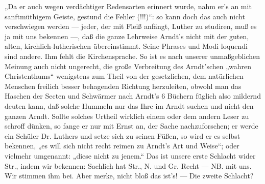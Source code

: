 „Da er auch wegen verdächtiger Redensarten erinnert wurde, nahm er’s an mit sanftmüthigem Geiste,
gestund die Fehler (!!!)“: so kann doch das auch nicht verschwiegen werden — jeder, der mit Fleiß
anfängt, Luther zu studiren, muß es ja mit uns bekennen —, daß die ganze Lehrweise Arndt’s
nicht mit der guten, alten, kirchlich-lutherischen übereinstimmt. Seine Phrases und Modi loquendi
sind andere. Ihm fehlt die Kirchensprache. So ist es nach unserer unmaßgeblichen Meinung auch nicht
ungerecht, die große Verbreitung des Arndt’schen „wahren Christenthums“ wenigstens zum Theil von
der gesetzlichen, dem natürlichen Menschen freilich besser behagenden Richtung herzuleiten, obwohl man
das Haschen der Secten und Schwärmer nach Arndt’s 6 Büchern füglich also mildernd deuten kann, daß
solche Hummeln nur das Ihre im Arndt suchen und nicht den ganzen Arndt. Sollte solches Urtheil wirklich
einem oder dem andern Leser zu schroff dünken, so fange er nur mit Ernst an, der Sache nachzuforschen;
er werde ein Schüler Dr. Luthers und setze sich zu seinen Füßen, so wird er es selbst bekennen, „es
will sich nicht recht reimen zu Arndt’s Art und Weise“; oder vielmehr umgenannt: „diese nicht zu
jenem.“ Das ist unsere erste Schlacht wider Str., indem wir
bekennen: Sachlich hat Str., N. und Gr. Recht — NB. mit uns. Wir stimmen ihm bei. Aber
merke, nicht bloß das ist’s! — Die zweite Schlacht?

